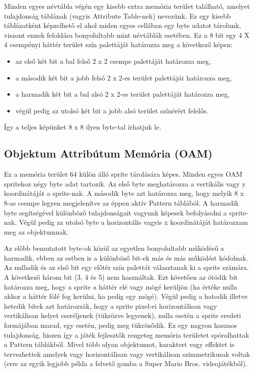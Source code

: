 	Minden egyes névtábla végén egy kisebb extra memória terület található, amelyet tulajdonság táblának (vagyis Attribute Table-nek) nevezünk. Ez egy kisebb táblázatként képzelhető el ahol miden egyes cellában egy byte adatot tárolunk, viszont ennek feloldása bonyolultabb mint névtáblák esetében. Ez a 8 bit egy 4 X 4 csempényi háttér terület szín palettáját határozza meg a következő képen:
	
	\begin{itemize}
		\item az első két bit a bal felső 2 x 2 csempe palettáját határozza meg, 
		\item a második két bit a jobb felső 2 x 2-es terület palettáját határozza meg, 
		\item a harmadik két bit a bal alsó 2 x 2-es terület palettáját határozza meg,
		\item végül pedig az utolsó két bit a jobb alsó terület színérért felelős.
	\end{itemize}
	
	 Így a teljes képünket 8 x 8 ilyen byte-tal írhatjuk le. 
 
 	 \subsection{Objektum Attribútum Memória (OAM)}
 	 Ez a memória terület 64 külön álló sprite tárolására képes. Minden egyes OAM spritehoz négy byte adat tartozik. Az első byte meghatározza a vertikális vagy y koordinátáját a sprite-nak. A második byte azt határozza meg, hogy melyik 8 x 8-as csempe legyen megjelenítve az éppen aktív Pattern táblából. A harmadik byte segítségével különböző tulajdonságait vagyunk képesek befolyásolni a sprite-nak. Végül pedig az utolsó byte a horizontális vagyis x koordinátáját határozzam meg az objektumnak.
 	 
 	 Az előbb bemutatott byte-ok közül az egyetlen bonyolultabb működésű a harmadik, ebben az estben is a különböző bit-ek más és más működést kódolnak.  Az nulladik és az első bit egy előtér szín palettát választanak ki a sprite számára. A következő három bit (3, 4 és 5) nem használtak. Ezt követően az ötödik bit határozza meg, hogy a sprite a háttér elé vagy mögé kerüljön (ha értéke nulla akkor a háttér fölé fog kerülni, ha pedig egy mögé). Végül pedig a hatodik illetve hetedik bitek azt határozzák, hogy a sprite pixel-ei horizontálisan vagy vertikálisan helyet cseréljenek (tükrözve legyenek), nulla esetén a sprite eredeti formájában marad, egy esetén, pedig meg tükröződik. Ez egy nagyon hasznos tulajdonság, hiszen így a játék fejlesztők rengeteg memória területet spórolhattak a Pattern táblákból. Mivel több olyan objektumot, karaktert vagy effektet is tervezhettek amelyek vagy horizontálisan vagy vertikálisan szimmetrikusak voltak (erre az egyik legjobb példa a felvető gomba  a Super Mario Bros. videojátékból).    
 	     

